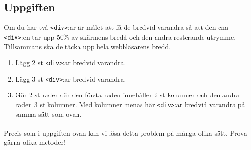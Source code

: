 \documentclass{article}
\begin{document}
    \subsection*{Uppgiften}
      Om du har två \texttt{<div>}:ar är målet att få de bredvid varandra så att den ena \texttt{<div>}:en tar upp 50\% av skärmens bredd och den andra resterande utrymme. Tillsammans ska de täcka upp hela webbläsarens bredd.
      \begin{enumerate}
        \item Lägg 2 st \texttt{<div>}:ar bredvid varandra.
        \item Lägg 3 st \texttt{<div>}:ar bredvid varandra.
        \item Gör 2 st rader där den första raden innehåller 2 st kolumner och den andra raden 3 st kolumner. Med kolumner menas här \texttt{<div>}:ar bredvid varandra på samma sätt som ovan.
      \end{enumerate}
      \paragraph{}
      Precis som i uppgiften ovan kan vi lösa detta problem på många olika sätt. Prova gärna olika metoder!




\end{document}
